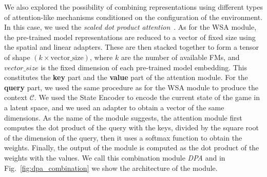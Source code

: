 We also explored the possibility of combining representations using different types of attention-like mechanisms conditioned on the configuration of the environment.
In this case, we used the \textit{scaled dot product attention}~\citep{vaswani2017attention}.
As for the WSA module, the pre-trained model representations are reduced to a vector of fixed size using the spatial and linear adapters.
These are then stacked together to form a tensor of shape $(k \times \text{vector\_size})$, where $k$ are the number of available FMs, and $vector\_size$ is the fixed dimension of each pre-trained model embedding.
This constitutes the \textbf{key} part and the \textbf{value} part of the attention module.
For the \textbf{query} part, we used the same procedure as for the WSA module to produce the context $\mathcal{C}$.
We used the State Encoder to encode the current state of the game in a latent space, and we used an adapter to obtain a vector of the same dimensions.
As the name of the module suggests, the attention module first computes the dot product of the query with the keys, divided by the square root of the dimension of the query, then it uses a softmax function to obtain the weights.
Finally, the output of the module is computed as the dot product of the weights with the values.
We call this combination module \textit{DPA} and in Fig.~\ref{fig:dpa_combination} we show the architecture of the module.


